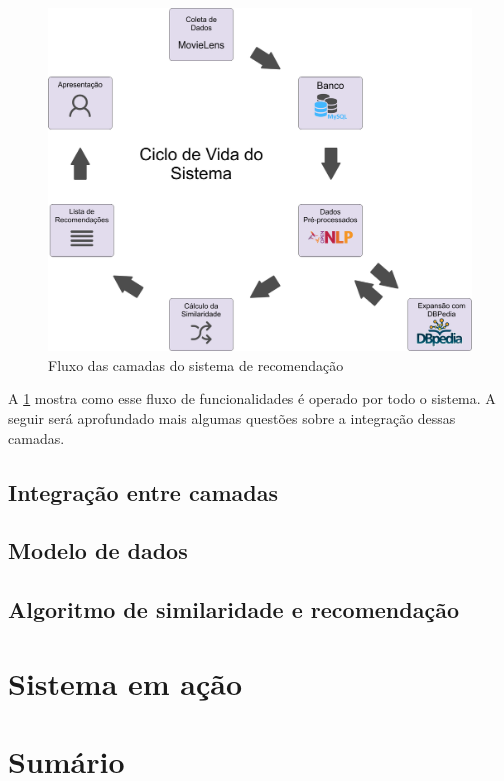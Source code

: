 \begin{figure}
	\centering
	\includegraphics[scale=0.80]{imagens/recsys_fluxo.png}
	\caption{Fluxo das camadas do sistema de recomendação}
	\label{fig:recsys_fluxo}
\end{figure}

A \ref{fig:recsys_fluxo} mostra como esse fluxo de funcionalidades é operado por todo o sistema. A seguir será aprofundado mais algumas questões sobre a integração dessas camadas.

\subsection{Integração entre camadas}

\subsection{Modelo de dados}

\label{ssec:dataModel}

\subsection{Algoritmo de similaridade e recomendação}

\label{ssec:recsysAlgo}

\section{Sistema em ação}

\section{Sumário}

